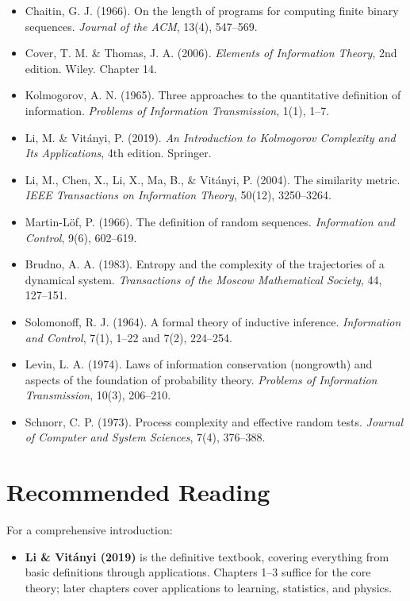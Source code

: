 \begin{itemize}
\item Chaitin, G. J. (1966). On the length of programs for computing finite binary sequences. \textit{Journal of the ACM}, 13(4), 547--569.
\item Cover, T. M. \& Thomas, J. A. (2006). \textit{Elements of Information Theory}, 2nd edition. Wiley. Chapter 14.
\item Kolmogorov, A. N. (1965). Three approaches to the quantitative definition of information. \textit{Problems of Information Transmission}, 1(1), 1--7.
\item Li, M. \& Vitányi, P. (2019). \textit{An Introduction to Kolmogorov Complexity and Its Applications}, 4th edition. Springer.
\item Li, M., Chen, X., Li, X., Ma, B., \& Vitányi, P. (2004). The similarity metric. \textit{IEEE Transactions on Information Theory}, 50(12), 3250--3264.
\item Martin-Löf, P. (1966). The definition of random sequences. \textit{Information and Control}, 9(6), 602--619.
\item Brudno, A. A. (1983). Entropy and the complexity of the trajectories of a dynamical system. \textit{Transactions of the Moscow Mathematical Society}, 44, 127--151.
\item Solomonoff, R. J. (1964). A formal theory of inductive inference. \textit{Information and Control}, 7(1), 1--22 and 7(2), 224--254.
\item Levin, L. A. (1974). Laws of information conservation (nongrowth) and aspects of the foundation of probability theory. \textit{Problems of Information Transmission}, 10(3), 206--210.
\item Schnorr, C. P. (1973). Process complexity and effective random tests. \textit{Journal of Computer and System Sciences}, 7(4), 376--388.
\end{itemize}



\section{Recommended Reading}

For a comprehensive introduction:

\begin{itemize}
\item \textbf{Li \& Vitányi (2019)} is the definitive textbook, covering everything from basic definitions through applications. Chapters 1--3 suffice for the core theory; later chapters cover applications to learning, statistics, and physics.
\end{itemize}

